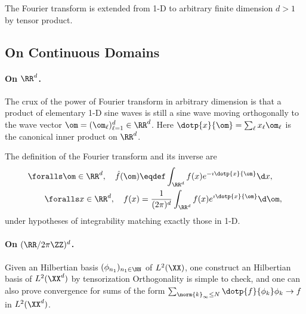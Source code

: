 The Fourier transform is extended from 1-D to arbitrary finite dimension $d>1$ by tensor product. 


\subsection{On Continuous Domains}

\paragraph{On $\RR^d$.}

The crux of the power of Fourier transform in arbitrary dimension is that a product of elementary 1-D sine waves is still a sine wave
moving orthogonally to the wave vector $\om=(\om_\ell)_{\ell=1}^d \in \RR^d$. Here $\dotp{x}{\om} = \sum_\ell x_\ell \om_\ell$ is the canonical inner product on $\RR^d$. 

The definition of the Fourier transform and its inverse are 
\begin{align*}
	\foralls \om \in \RR^d, \quad \hat f(\om) &\eqdef \int_{\RR^d} f(x) e^{-\imath\dotp{x}{\om}} \d x, \\
	\foralls x \in \RR^d, \quad  f(x) &= \frac{1}{(2\pi)^d} \int_{\RR^d} f(x) e^{\imath\dotp{x}{\om}} \d \om,
\end{align*}
under hypotheses of integrability matching exactly those in 1-D.




\paragraph{On $(\RR/2\pi\ZZ)^d$.}

Given an Hilbertian basis $(\phi_{n_1})_{n_1 \in \NN}$ of $L^2(\XX)$, one construct an Hilbertian basis of $L^2(\XX^d)$ by tensorization
Orthogonality is simple to check, and one can also prove convergence for sums of the form $\sum_{\norm{k}_\infty \leq N} \dotp{f}{\phi_k} \phi_k \rightarrow f$ in $L^2(\XX^d)$.

